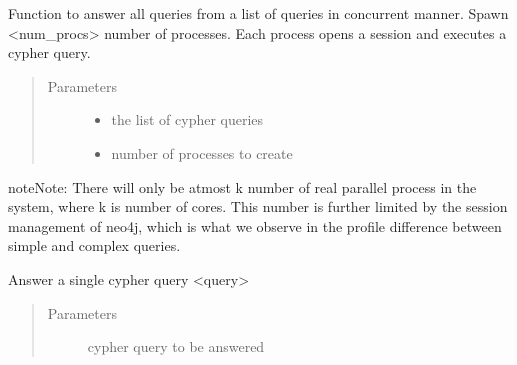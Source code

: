 \documentclass[letterpaper,10pt,english]{sphinxmanual}
\begin{document}
\begin{fulllineitems}
\label{\detokenize{benchmarking:query_answering.answer_queries_par}}
Function to answer all queries from a list of queries in concurrent manner. Spawn \textless{}num\_procs\textgreater{} number
of processes. Each process opens a session and executes a cypher query.
\begin{quote}\begin{description}
\item[{Parameters}] \leavevmode\begin{itemize}
\item {} 
 \textendash{} the list of cypher queries

\item {} 
 \textendash{} number of processes to create

\end{itemize}

\end{description}\end{quote}

\begin{sphinxadmonition}{note}{Note:}
There will only be atmost k number of real parallel process in the system, where k is number of cores. This
number is further limited by the session management of neo4j, which is what we observe in the profile difference between simple and complex queries.
\end{sphinxadmonition}

\end{fulllineitems}


\begin{fulllineitems}
\label{\detokenize{benchmarking:query_answering.answer_query}}
Answer a single cypher query \textless{}query\textgreater{}
\begin{quote}\begin{description}
\item[{Parameters}] \leavevmode
{} \textendash{} cypher query to be answered

\end{description}\end{quote}

\end{fulllineitems}
\end{document}
